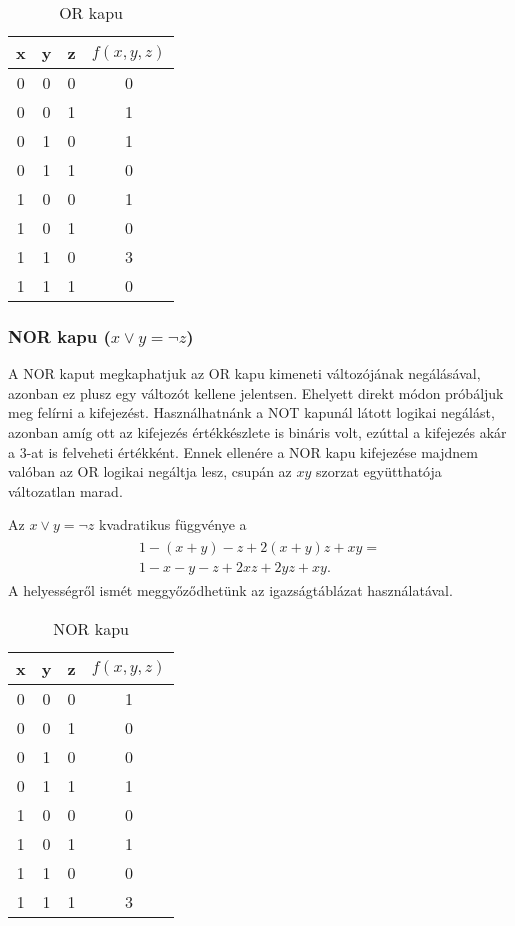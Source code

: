	\begin{table}[ht]
	\footnotesize
	\centering
	\begin{tabular}{ c c c c }
		\toprule
		x & y & z & $f(x,y,z)$ \\
		\midrule
		0 & 0 & 0 & 0 \\
		0 & 0 & 1 & 1 \\
		0 & 1 & 0 & 1 \\
		0 & 1 & 1 & 0 \\
		1 & 0 & 0 & 1 \\
		1 & 0 & 1 & 0 \\
		1 & 1 & 0 & 3 \\
		1 & 1 & 1 & 0 \\		
		\bottomrule
	\end{tabular}
	\caption{OR kapu}
	\label{tab:ORgate}
\end{table}


\subsubsection{NOR kapu ($x \vee y = \neg z$)}

A NOR kaput megkaphatjuk az OR kapu kimeneti változójának negálásával, azonban ez plusz egy változót kellene jelentsen. Ehelyett direkt módon próbáljuk meg felírni a kifejezést. Használhatnánk a NOT kapunál látott logikai negálást, azonban amíg ott az kifejezés értékkészlete is bináris volt, ezúttal a kifejezés akár a $3$-at is felveheti értékként. Ennek ellenére a NOR kapu kifejezése majdnem valóban az OR logikai negáltja lesz, csupán az $xy$ szorzat együtthatója változatlan marad.

\begin{allitas}
	Az $x \vee y = \neg z$ kvadratikus függvénye a 
	\begin{align}
	\begin{split}
		1-(x+y)-z+2(x+y)z+xy = \\
		 1-x-y-z+2xz+2yz+xy.
	\end{split}
	\end{align}	
	A helyességről ismét meggyőződhetünk az igazságtáblázat használatával.
\end{allitas}

\begin{table}[ht]
	\footnotesize
	\centering
	\begin{tabular}{ c c c c }
		\toprule
		x & y & z & $f(x,y,z)$ \\
		\midrule
		0 & 0 & 0 & 1 \\
		0 & 0 & 1 & 0 \\
		0 & 1 & 0 & 0 \\
		0 & 1 & 1 & 1 \\
		1 & 0 & 0 & 0 \\
		1 & 0 & 1 & 1 \\
		1 & 1 & 0 & 0 \\
		1 & 1 & 1 & 3 \\		
		\bottomrule
	\end{tabular}
	\caption{NOR kapu}
	\label{tab:NORgate}
\end{table}

